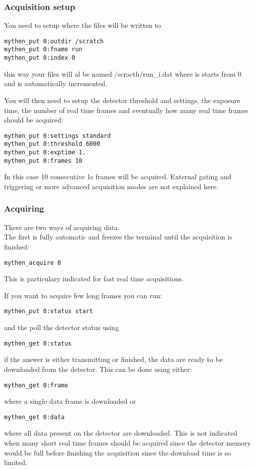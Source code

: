 \documentclass{report}
\begin{document}
\subsubsection{Acquisition setup}
You need to setup where the files will be written to
\begin{verbatim}
mythen_put 0:outdir /scratch
mythen_put 0:fname run
mythen_put 0:index 0
\end{verbatim}
this way your files will al be named /scracth/run\_i.dat where is starts from 0 and is automatically incremented.

You will then need to setup the detector threshold and settings, the exposure time, the number of real time frames and eventually how many real time frames should be acquired:
\begin{verbatim}
mythen_put 0:settings standard
mythen_put 0:threshold 6000
mythen_put 0:exptime 1.
mythen_put 0:frames 10
\end{verbatim}
In this case 10 consecutive 1s frames will be acquired.
External gating and triggering or more advanced acquisition modes are not explained here.
\subsubsection{Acquiring}
There are two ways of acquiring data.\\
The first is fully automatic and freezes the terminal until the acquisition is finished:
\begin{verbatim}
mythen_acquire 0
\end{verbatim}
This is particulary indicated for fast real time acquisitions.


If you want to acquire few long frames you can run:
\begin{verbatim}
mythen_put 0:status start
\end{verbatim}
and the poll the detector status using
\begin{verbatim}
mythen_get 0:status 
\end{verbatim}
if the answer is either transmitting or finished, the data are ready to be downloaded from the detector.
This can be done using either:
\begin{verbatim}
mythen_get 0:frame
\end{verbatim}
where a single data frame is downloaded or
\begin{verbatim}
mythen_get 0:data
\end{verbatim}
where all data present on the detector are downloaded.
This is not indicated when many short real time frames should be acquired since the detector memory would be full before finishing the acquisition since the download time is so limited.
\end{document}
